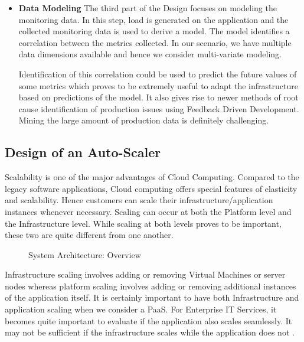 \documentclass[article,type=msc,colorback,12pt,accentcolor=tud7b]{tudthesis}
\begin{document}
\begin{itemize}
	 	\item {\textbf{Data Modeling}} 
	 	\newline The third part of the Design focuses on modeling the monitoring data. In this step, load is generated on the application and the collected monitoring data is used to derive a model. The model identifies a correlation between the metrics collected. In our scenario, we have multiple data dimensions available and hence we consider multi-variate modeling.
	 	
	 	\par Identification of this correlation could be used to predict the future values of some metrics which proves to be extremely useful to adapt the infrastructure based on predictions of the model. It also gives rise to newer methods of root cause identification of production issues using Feedback Driven Development. Mining the large amount of production data is definitely challenging.
 	 	
 	 \end{itemize}
 	
 	\subsection{Design of an Auto-Scaler}
 	
 	Scalability is one of the major advantages of Cloud Computing. Compared to the legacy software applications, Cloud computing offers special features of elasticity and scalability. Hence customers can scale their infrastructure/application instances whenever necessary. Scaling can occur at both the Platform level and the Infrastructure level. While scaling at both levels proves to be important, these two are quite different from one another. 
 	
 	 \begin{figure}[!h]
 	 	\begin{center}
 	 		\makebox[\textwidth]{\texttt{[image: C3]}}
 	 	\end{center}
 	 	\caption{System Architecture: Overview}
 	 \end{figure}
 	
 	Infrastructure scaling involves adding or removing Virtual Machines or server nodes whereas platform scaling involves adding or removing additional instances of the application itself. It is certainly important to have both Infrastructure and application scaling when we consider a PaaS. For Enterprise IT Services, it becomes quite important to evaluate if the application also scales seamlessly. It may not be sufficient if the infrastructure scales while the application does not \cite{app_infra_scale}. 
 	
\end{document}
